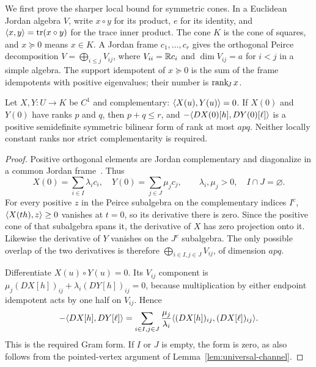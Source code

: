 We first prove the sharper local bound for symmetric cones. In a Euclidean Jordan algebra $V$, write $x\circ y$ for
its product, $e$ for its identity, and $\langle x,y\rangle=\operatorname{tr}(x\circ y)$ for the
trace inner product. The cone $K$ is the cone of squares, and $x\succeq0$
means $x\in K$. A Jordan frame $c_1,\ldots,c_r$ gives the orthogonal
Peirce decomposition $V=\bigoplus_{i\leq j}V_{ij}$, where
$V_{ii}=\mathbb R c_i$ and $\dim V_{ij}=a$ for $i<j$ in a simple algebra.
The support idempotent of $x\succeq0$ is the sum of the frame idempotents
with positive eigenvalues; their number is $\operatorname{rank}_{\!J} x$.

\begin{lemma}\label{lem:peirce-channel}
Let $X,Y:U\to K$ be $C^1$ and complementary:
$\langle X(u),Y(u)\rangle=0$. If $X(0)$ and $Y(0)$ have ranks $p$ and $q$,
then $p+q\leq r$, and
$-\langle DX(0)[h],DY(0)[\ell]\rangle$ is a positive semidefinite symmetric
bilinear form of rank at most $apq$. Neither locally constant ranks nor
strict complementarity is required.
\end{lemma}
\begin{proof}
Positive orthogonal elements are Jordan complementary and diagonalize in
a common Jordan frame~\cite[Chapters~III--IV]{FK1994}. Thus
\[
 X(0)=\sum_{i\in I}\lambda_i c_i,\quad
 Y(0)=\sum_{j\in J}\mu_j c_j,
 \qquad \lambda_i,\mu_j>0,\quad I\cap J=\varnothing.
\]
For every positive $z$ in the Peirce subalgebra on the complementary
indices $I^c$, $\langle X(th),z\rangle\geq0$ vanishes at $t=0$, so its derivative
there is zero. Since the positive cone of that subalgebra spans it, the
derivative of $X$ has zero projection onto it. Likewise the derivative of $Y$ vanishes
on the $J^c$ subalgebra. The only possible overlap of the two derivatives
is therefore $\bigoplus_{i\in I,j\in J}V_{ij}$, of dimension $apq$.

Differentiate $X(u)\circ Y(u)=0$. Its $V_{ij}$ component is
$\mu_j(DX[h])_{ij}+\lambda_i(DY[h])_{ij}=0$, because multiplication
by either endpoint idempotent acts by one half on $V_{ij}$. Hence
\begin{equation}\label{eq:peirce-gram}
 -\langle DX[h],DY[\ell]\rangle
 =\sum_{i\in I,j\in J}\frac{\mu_j}{\lambda_i}
       \langle (DX[h])_{ij},(DX[\ell])_{ij}\rangle.
\end{equation}
This is the required Gram form. If $I$ or $J$ is empty, the form is zero,
as also follows from the pointed-vertex argument of
Lemma~\ref{lem:universal-channel}.
\end{proof}

